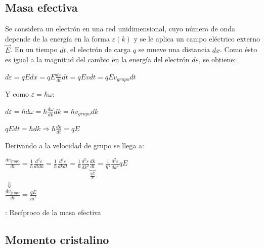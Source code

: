 \documentclass[oneside]{book}
\numberwithin{equation}{section}
\numberwithin{figure}{section}
\numberwithin{table}{section}
\begin{document}
			\subsection{Masa efectiva}
			
				Se considera un electrón en una red unidimensional, cuyo número de onda depende de la energía en la forma $\varepsilon(k)$ y se le aplica un campo eléctrico externo $\vec{E}$. En un tiempo $dt$, el electrón de carga $q$ se mueve una distancia $dx$. Como ésto es igual a la magnitud del cambio en la energía del electrón $d\varepsilon$, se obtiene:
				
				\begin{center}
					$\displaystyle d\varepsilon=q E dx=q E \frac{dx}{dt}dt=q E v dt=q E v_{grupo} dt$\\
				\end{center}
				
				Y como $\varepsilon=\hbar\omega$:				
				
				\begin{center}
					$\displaystyle d\varepsilon=\hbar d\omega=\hbar \frac{d \omega}{dk}dk=\hbar v_{grupo} dk$\\
				\end{center}			
			
				\begin{center}
					$\displaystyle q E dt=\hbar dk \Rightarrow \hbar\frac{dk}{dt}=q E$
				\end{center}			
			
				Derivando a la velocidad de grupo se llega a:
				
				\begin{center}
					$\displaystyle \frac{d v_{grupo}}{dt}=\frac{1}{\hbar}\frac{d^2 \varepsilon}{dt dk}=\frac{1}{\hbar}\frac{d^2 \varepsilon}{dk dt}=\frac{1}{\hbar}\frac{d^2 \varepsilon}{d k^2}\underbrace{\frac{dk}{dt}}_{\frac{qE}{\hbar}}=\frac{1}{\hbar^2}\frac{d^2 \varepsilon}{d k^2}qE$\\
					$\Downarrow$\\
					$\displaystyle \frac{d v_{grupo}}{dt}=\frac{qE}{m^*}$
				\end{center}
				
				\begin{center}
					: Recíproco de la masa efectiva	
				\end{center}
			
			\subsection{Momento cristalino}
			
\end{document}
